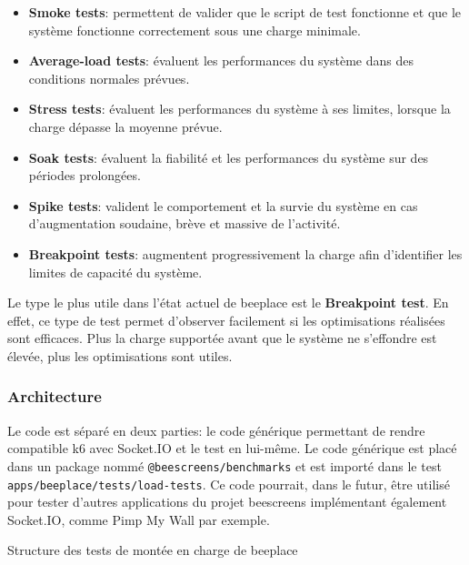 \begin{itemize}
  \item \textbf{Smoke tests}: permettent de valider que le script de test fonctionne et que le système fonctionne correctement sous une charge minimale.
  \item \textbf{Average-load tests}: évaluent les performances du système dans des conditions normales prévues.
  \item \textbf{Stress tests}: évaluent les performances du système à ses limites, lorsque la charge dépasse la moyenne prévue.
  \item \textbf{Soak tests}: évaluent la fiabilité et les performances du système sur des périodes prolongées.
  \item  \textbf{Spike tests}: valident le comportement et la survie du système en cas d'augmentation soudaine, brève et massive de l'activité.
  \item \textbf{Breakpoint tests}: augmentent progressivement la charge afin d'identifier les limites de capacité du système.
\end{itemize}

Le type le plus utile dans l'état actuel de \gls{beeplace} est le \textbf{Breakpoint test}. En effet, ce type de test permet d'observer facilement si les optimisations réalisées sont efficaces. Plus la charge supportée avant que le système ne s'effondre est élevée, plus les optimisations sont utiles.

\subsubsection{Architecture}

Le code est séparé en deux parties: le code générique permettant de rendre compatible k6 avec Socket.IO et le test en lui-même. Le code générique est placé dans un package nommé \texttt{@beescreens/benchmarks} et est importé dans le test \texttt{apps/beeplace/tests/load-tests}. Ce code pourrait, dans le futur, être utilisé pour tester d'autres applications du projet \gls{beescreens} implémentant également Socket.IO, comme Pimp My Wall par exemple.

\begin{listing}[H]
  \begin{tcolorbox}[arc=0mm,colback=white!5!white]
  \end{tcolorbox}
  \caption{Structure des tests de montée en charge de \gls{beeplace}
    \label{listing:load-tests-structure}}
\end{listing}


